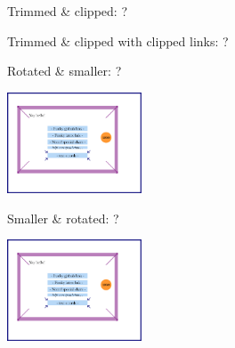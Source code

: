 \documentclass[12pt]{article}
\begin{document}
\vspace{4cm}
Trimmed \& clipped: ?

\fboxsep=0pt\relax
{}

\vspace{4cm}
Trimmed \& clipped with clipped links: ?

\fboxsep=0pt\relax
{}


\clearpage

Rotated \& smaller: ?

\includegraphics[angle=10,width=4cm]{testgraphics2}

Smaller \& rotated: ?

\includegraphics[width=4cm,angle=10]{testgraphics2}
\end{document}

